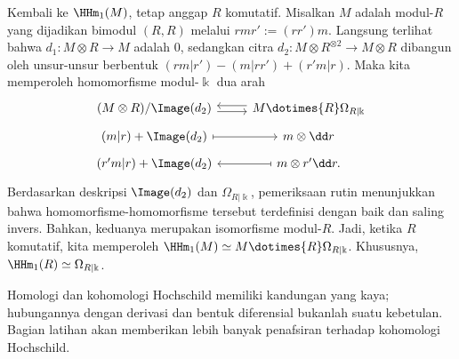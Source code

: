 \begin{contoh}
	Kembali ke $\HHm_1(M)$, tetap anggap $R$ komutatif. Misalkan $M$ adalah
	modul-$R$ yang dijadikan bimodul $(R,R)$ melalui $rmr':=(rr')m$.
	Langsung terlihat bahwa $d_1:M\otimes R\to M$ adalah $0$, sedangkan citra
	$d_2:M\otimes R^{\otimes2}\to M\otimes R$ dibangun oleh unsur-unsur
	berbentuk $(rm|r')-(m|rr')+(r'm|r)$. Maka kita memperoleh homomorfisme
	modul-$\Bbbk$ dua arah
	\[\begin{tikzcd}[row sep=tiny]
		(M \otimes R) / \Image(d_2) \arrow[shift right, r]
		& M \dotimes{R} \Omega_{R|\Bbbk} \arrow[shift right, l] \\
		(m|r) + \Image(d_2) \arrow[mapsto, r] & m \otimes \dd r \\
		(r'm|r) + \Image(d_2)
		& m \otimes r' \dd r \arrow[mapsto, l] .
	\end{tikzcd}\]
	Berdasarkan deskripsi $\Image(d_2)$ dan $\Omega_{R|\Bbbk}$, pemeriksaan
	rutin menunjukkan bahwa homomorfisme-homomorfisme tersebut terdefinisi
	dengan baik dan saling invers. Bahkan, keduanya merupakan isomorfisme
	modul-$R$. Jadi, ketika $R$ komutatif, kita memperoleh
	$\HHm_1(M)\simeq M\dotimes{R}\Omega_{R|\Bbbk}$. Khususnya,
	$\HHm_1(R)\simeq\Omega_{R|\Bbbk}$.
\end{contoh}

Homologi dan kohomologi Hochschild memiliki kandungan yang kaya; hubungannya
dengan derivasi dan bentuk diferensial bukanlah suatu kebetulan. Bagian latihan
akan memberikan lebih banyak penafsiran terhadap kohomologi Hochschild.

